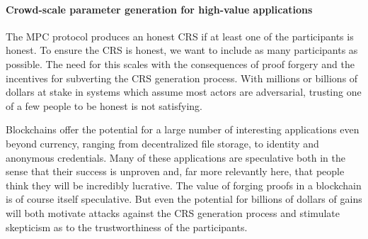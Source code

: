 \documentclass{article}
\begin{document}




\paragraph*{Crowd-scale parameter generation for high-value applications}
The MPC protocol produces an honest CRS if at least one of the participants is honest. To ensure the CRS is honest, we want to include as many participants as possible. The need for this scales with the consequences of proof forgery and the incentives for subverting the CRS generation process. With millions or billions of dollars at stake in systems which assume most actors are adversarial, trusting one of a few people to be honest is not satisfying.

Blockchains offer the potential for a large number of interesting applications  even beyond currency, ranging from decentralized file storage, to identity and anonymous credentials.  Many of these  applications are speculative both in the sense that their success is unproven and, far more relevantly here, that people think they will be incredibly lucrative. The value of forging proofs in a blockchain is of course itself speculative. But even the potential for billions of dollars of gains will both  motivate attacks against the CRS generation process and stimulate skepticism as to the trustworthiness of the participants.
\end{document}
